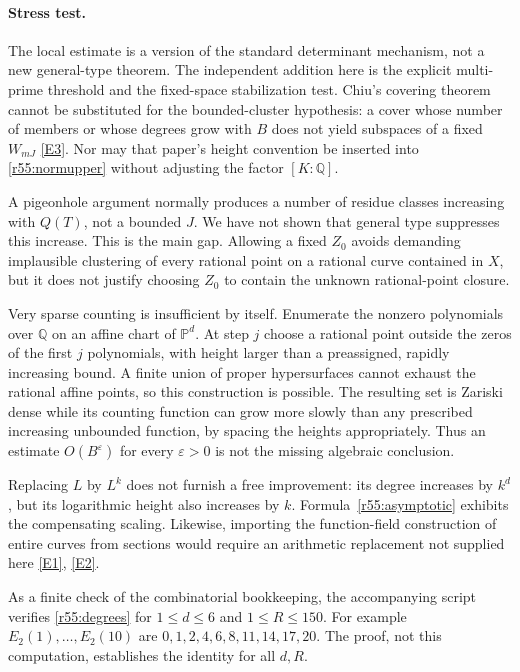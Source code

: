 \documentclass[11pt,a4paper]{article}
\newcommand{\Q}{\mathbb{Q}}
\newcommand{\eref}[2]{\hyperlink{extra:#1:#2}{[E#2]}}
\numberwithin{equation}{section}
\begin{document}
\paragraph{Stress test.}
The local estimate is a version of the standard determinant mechanism, not a new general-type theorem. The independent addition here is the explicit multi-prime threshold and the fixed-space stabilization test. Chiu's covering theorem cannot be substituted for the bounded-cluster hypothesis: a cover whose number of members or whose degrees grow with $B$ does not yield subspaces of a fixed $W_{mJ}$ \eref{9400081}{3}. Nor may that paper's height convention be inserted into \eqref{r55:normupper} without adjusting the factor $[K:\Q]$.

A pigeonhole argument normally produces a number of residue classes increasing with $Q(T)$, not a bounded $J$. We have not shown that general type suppresses this increase. This is the main gap. Allowing a fixed $Z_0$ avoids demanding implausible clustering of every rational point on a rational curve contained in $X$, but it does not justify choosing $Z_0$ to contain the unknown rational-point closure.

Very sparse counting is insufficient by itself. Enumerate the nonzero polynomials over $\Q$ on an affine chart of $\mathbb P^d$. At step $j$ choose a rational point outside the zeros of the first $j$ polynomials, with height larger than a preassigned, rapidly increasing bound. A finite union of proper hypersurfaces cannot exhaust the rational affine points, so this construction is possible. The resulting set is Zariski dense while its counting function can grow more slowly than any prescribed increasing unbounded function, by spacing the heights appropriately. Thus an estimate $O(B^\varepsilon)$ for every $\varepsilon>0$ is not the missing algebraic conclusion.

Replacing $L$ by $L^k$ does not furnish a free improvement: its degree increases by $k^d$, but its logarithmic height also increases by $k$. Formula~\eqref{r55:asymptotic} exhibits the compensating scaling. Likewise, importing the function-field construction of entire curves from sections would require an arithmetic replacement not supplied here \eref{9400081}{1}, \eref{9400081}{2}.

As a finite check of the combinatorial bookkeeping, the accompanying script verifies \eqref{r55:degrees} for $1\leq d\leq6$ and $1\leq R\leq150$. For example $E_2(1),\ldots,E_2(10)$ are $0,1,2,4,6,8,11,14,17,20$. The proof, not this computation, establishes the identity for all $d,R$.
\end{document}
